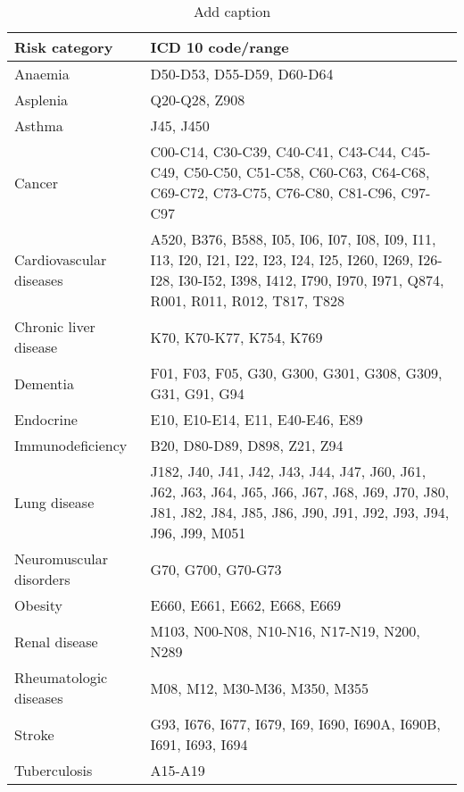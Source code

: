 \begin{table}[htbp]
  \centering
  \caption{Add caption}
    \begin{tabular}{ll}
    Risk category & ICD 10 code/range \\
    \midrule
    Anaemia & D50-D53, D55-D59, D60-D64 \\
    Asplenia & Q20-Q28, Z908 \\
    Asthma & J45, J450 \\
    Cancer & \multicolumn{1}{p{68.5em}}{C00-C14, C30-C39, C40-C41, C43-C44, C45-C49, C50-C50, C51-C58,\newline{} C60-C63, C64-C68, C69-C72, C73-C75, C76-C80, C81-C96, C97-C97} \\
    Cardiovascular diseases & \multicolumn{1}{p{68.5em}}{A520, B376, B588, I05, I06, I07, I08, I09, I11, I13, I20, I21, I22, I23, I24,\newline{} I25, I260, I269, I26-I28, I30-I52, I398, I412, I790, I970, I971, Q874,\newline{} R001, R011, R012, T817, T828} \\
    Chronic liver disease & K70, K70-K77, K754, K769 \\
    Dementia & F01, F03, F05, G30, G300, G301, G308, G309, G31, G91, G94 \\
    Endocrine & E10, E10-E14, E11, E40-E46, E89 \\
    Immunodeficiency  & B20, D80-D89, D898, Z21, Z94 \\
    Lung disease & \multicolumn{1}{p{68.5em}}{J182, J40, J41, J42, J43, J44, J47, J60, J61, J62, J63, J64, J65, J66, J67, J68,\newline{} J69, J70, J80, J81, J82, J84, J85, J86, J90, J91, J92, J93, J94, J96, J99, M051} \\
    Neuromuscular disorders & G70, G700, G70-G73 \\
    Obesity & E660, E661, E662, E668, E669 \\
    Renal disease & M103, N00-N08, N10-N16, N17-N19, N200, N289 \\
    Rheumatologic diseases & M08, M12, M30-M36, M350, M355 \\
    Stroke & G93, I676, I677, I679, I69, I690, I690A, I690B, I691, I693, I694 \\
    Tuberculosis & A15-A19 \\
    \end{tabular}%
  \label{tab:addlabel}%
\end{table}%
